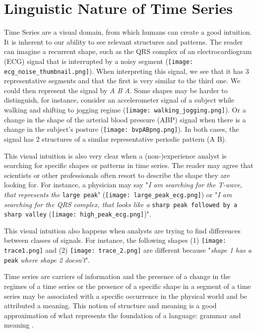 \section{Linguistic Nature of Time Series}
\label{sub:context1}

Time Series are a visual domain, from which humans can create a good intuition. It is inherent to our ability to see relevant structures and patterns. The reader can imagine a recurrent shape, such as the \textcolor{myblue}{QRS complex} of an electrocardiogram (ECG) signal that is interrupted by a \textcolor{myred}{noisy} segment (\texttt{[image: ecg\_noise\_thumbnail.png]}). When interpreting this signal, we see that it has 3 representative segments and that the first is very similar to the third one. We could then represent the signal by \textit{\textcolor{myblue}{A} \textcolor{myred}{B} \textcolor{myblue}{A}}. Some shapes may be harder to distinguish, for instance, consider an accelerometer signal of a subject while \textcolor{myblue}{walking} and shifting to \textcolor{mygreen}{jogging} regime (\texttt{[image: walking\_jogging.png]}). Or a change in the shape of the arterial blood pressure (ABP) signal when there is a change in the subject's posture (\texttt{[image: bvpABpng.png]}). In both cases, the signal has 2 structures of a similar representative periodic pattern (\textcolor{myblue}{A} \textcolor{mygreen}{B}).

This visual intuition is also very clear when a (non-)experience analyst is searching for specific shapes or patterns in time series. The reader may agree that scientists or other professionals often resort to describe the shape they are looking for. For instance, a physician may say "\textit{I am searching for the T-wave, that represents the} \texttt{large peak}" (\texttt{[image: large\_peak\_ecg.png]}) or "\textit{I am searching for the QRS complex, that looks like a} \texttt{sharp peak followed by a sharp valley} (\texttt{[image: high\_peak\_ecg.png]})".

This visual intuition also happens when analysts are trying to find differences between classes of signals. For instance, the following shapes (1) \texttt{[image: trace1.png]} and (2) \texttt{[image: trace\_2.png]} are different because "\textit{shape 1 has a} \texttt{peak} \textit{where shape 2 doesn't}". 

Time series are carriers of information 
and the presence of a change in the regimes of a time series or the presence of a specific shape in a segment of a time series may be associated with a specific occurrence in the physical world and be attributed a meaning. This notion of structure and meaning is a good approximation of what represents the foundation of a language: grammar and meaning \cite{grammar}.

